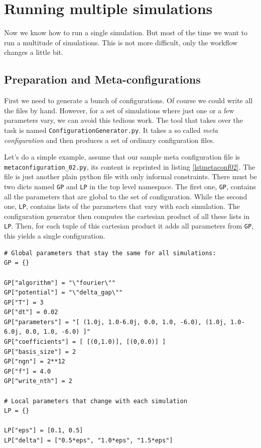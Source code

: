 \documentclass[a4paper,10pt]{report}
\begin{document}
\section{Running multiple simulations}

Now we know how to run a single simulation. But most of the time we want to run
a multitude of simulations. This is not more difficult, only the workflow changes
a little bit.

\subsection{Preparation and Meta-configurations}

First we need to generate a bunch of configurations. Of course we could write all
the files by hand. However, for a set of simulations where just one or a few
parameters vary, we can avoid this tedious work. The tool that takes over the
task is named \texttt{ConfigurationGenerator.py}. It takes a so called \emph{meta configuration}
and then produces a set of ordinary configuration files.

Let's do a simple example, assume that our sample meta configuration file is \texttt{metaconfiguration\_02.py},
its content is reprinted in listing \ref{lstmetaconf02}. The file is just another
plain python file with only informal constraints. There must be two dicts named
\texttt{GP} and \texttt{LP} in the top level namespace. The first one, \texttt{GP},
contains all the parameters that are global to the set of configuration. While the second
one, \texttt{LP}, contains lists of the parameters that vary with each simulation.
The configuration generator then computes the cartesian product of all these
lists in \texttt{LP}. Then, for each tuple of this cartesian product it adds all
parameters from \texttt{GP}, this yields a single configuration.

\begin{lstlisting}[float=tp,frame=single,label=lstmetaconf02,caption={Sample meta configuration \texttt{metaconfiguration\_02.py}}]
# Global parameters that stay the same for all simulations:
GP = {}

GP["algorithm"] = "\"fourier\""
GP["potential"] = "\"delta_gap\""
GP["T"] = 3
GP["dt"] = 0.02
GP["parameters"] = "[ (1.0j, 1.0-6.0j, 0.0, 1.0, -6.0), (1.0j, 1.0-6.0j, 0.0, 1.0, -6.0) ]"
GP["coefficients"] = [ [(0,1.0)], [(0,0.0)] ]
GP["basis_size"] = 2
GP["ngn"] = 2**12
GP["f"] = 4.0
GP["write_nth"] = 2

# Local parameters that change with each simulation
LP = {}

LP["eps"] = [0.1, 0.5]
LP["delta"] = ["0.5*eps", "1.0*eps", "1.5*eps"]
\end{lstlisting}
\end{document}
